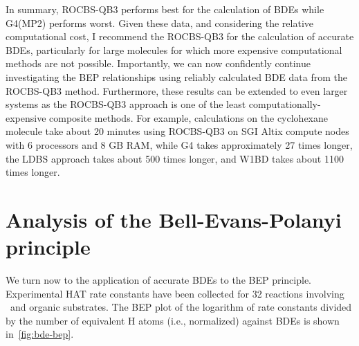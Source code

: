 In summary, ROCBS-QB3 performs best for the calculation of  BDEs while
G4(MP2) performs worst. Given these data, and considering the relative
computational cost, I recommend the ROCBS-QB3 for the calculation of accurate
BDEs, particularly for large molecules for which more expensive computational
methods are not possible. Importantly, we can now confidently continue
investigating the BEP relationships using reliably calculated BDE data from the
ROCBS-QB3 method. Furthermore, these results can be extended to even larger
systems as the ROCBS-QB3 approach is one of the least computationally-expensive
composite methods. For example, calculations on the cyclohexane molecule take
about 20 minutes using ROCBS-QB3 on SGI Altix compute nodes with 6 processors
and 8 GB RAM, while G4 takes approximately 27 times longer, the LDBS approach
takes about 500 times longer, and W1BD takes about 1100 times longer.

\section{Analysis of the Bell-Evans-Polanyi principle}

We turn now to the application of accurate BDEs to the BEP principle.
Experimental HAT rate constants have been collected for 32 reactions involving
\cumo\ and organic substrates. The BEP plot of the logarithm of rate constants
divided by the number of equivalent H atoms (i.e., normalized) against BDEs is
shown in~\ref{fig:bde-bep}.

